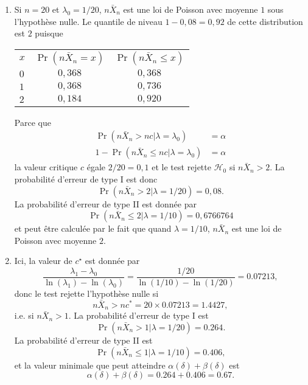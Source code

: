 \begin{solution}{6.3}
\begin{enumerate}
\item Si $n=20$ et $\lambda_0 = 1/20$, $n\bar X_n$ est une loi de Poisson avec moyenne $1$ sous l'hypothèse nulle. Le quantile de niveau $1-0,08 = 0,92$ de cette distribution est $2$ puisque
\begin{center}
\begin{tabular}{lcc}
$x$ & $\Pr(n\bar X_n =x)$ & $\Pr(n\bar X_n \leq x)$ \\
$0$ & $0,368$ & $0,368$ \\
$1$ & $0,368$ & $0,736$ \\
$2$ & $0,184$ & $0,920$ \\
\end{tabular}
\end{center}
Parce que
\begin{align*}
\Pr( n \bar X_n > nc  |  \lambda = \lambda_0) &= \alpha \\
1-\Pr( n \bar X_n \leq nc  |  \lambda = \lambda_0) &= \alpha
\end{align*}
la valeur critique $c$ égale  $2/20 = 0,1$ et le test rejette $\mathcal{H}_0$ si $n \bar X_n > 2$. La probabilité d'erreur de type I est donc
$$
\Pr(n\bar X_n > 2  |  \lambda = 1/20) = 0,08.
$$
La probabilité d'erreur de type II est donnée par
$$
\Pr(n \bar X_n \le 2  |  \lambda =1/10) = 0,6766764
$$
et peut être calculée par le fait que quand $\lambda =1/10$, $n\bar X_n$ est une loi de Poisson avec moyenne $2$.


\item Ici, la valeur de $c^\star$ est donnée par
$$
\frac{\lambda_1 -\lambda_0}{\ln(\lambda_1) - \ln(\lambda_0)} = \frac{1/20}{\ln(1/10) - \ln(1/20)} = 0.07213,
$$
donc le test rejette l'hypothèse nulle si
$$
n\bar X_n > nc^* = 20\times 0.07213 = 1.4427,
$$
i.e. si $n \bar X_n > 1$. La probabilité d'erreur de type I est
$$
\Pr(n \bar X_n > 1  |  \lambda =1/20) = 0.264.
$$
La probabilité d'erreur de type II est
$$
\Pr(n \bar X_n \le 1  |  \lambda =1/10) = 0.406,
$$
et la valeur minimale que peut atteindre $\alpha(\delta) + \beta(\delta)$ est
$$
\alpha(\delta) + \beta(\delta) = 0.264 + 0.406 = 0.67.
$$
\end{enumerate}
\end{solution}

